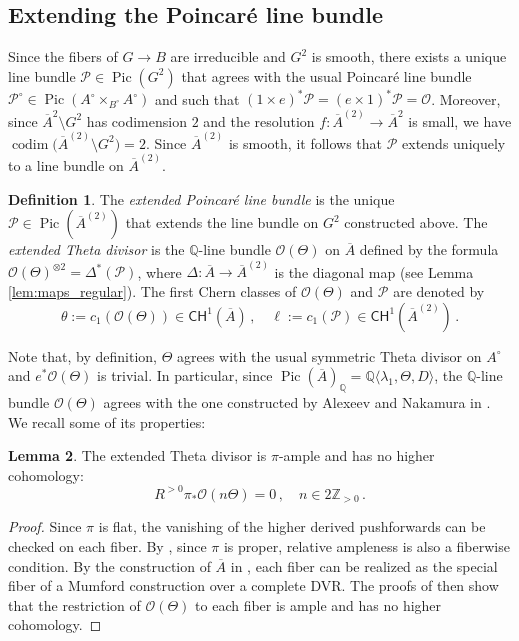 \documentclass[11pt]{article}
\def\CH{\mathsf{CH}}
\def\P{\mathcal{P}}
\def\QQ{\mathbb{Q}}
\newcommand{\barA}{\overline{A}}
\newcommand{\Pic}{\operatorname{Pic}}
\theoremstyle{definition}
\newtheorem{definition}{Definition}[section]
\newtheorem{lemma}[definition]{Lemma}
\begin{document}
\subsection{Extending the Poincar\'e line bundle}\label{subs:extP}

Since the fibers of $G \to B$ are irreducible and $G^2$ is smooth, there exists a unique line bundle $\mathcal P \in \Pic(G^2)$ that agrees with the usual Poincar\'e line bundle $\mathcal P^{\circ} \in \Pic(A^{\circ }\times_{B^\circ}A^{\circ })$ and such that $(1 \times e)^* \mathcal P = (e\times 1)^*\mathcal P = \mathcal O$. Moreover, since $\barA^{2} \setminus G^{2}$ has codimension $2$ and the resolution $f: \barA^{(2)} \to \barA^2$ is small, we have $\operatorname{codim}\big(\barA^{(2)} \setminus G^2\big)=2$. Since $\barA^{(2)}$ is smooth, it follows that $\mathcal{P}$ extends uniquely to a line bundle on $\barA^{(2)}$.

\begin{definition}
	The \emph{extended Poincar\'e line bundle} is the unique $\mathcal P \in \Pic(\barA^{(2)})$ that extends the line bundle on $G^2$ constructed above. The \emph{extended Theta divisor} is the $\mathbb Q$-line bundle $\mathcal O(\Theta)$ on $\barA$ defined by the formula $\mathcal O(\Theta)^{\otimes 2} = \Delta^*(\mathcal P)$, where $\Delta : \barA \to \barA^{(2)}$ is the diagonal map (see Lemma \ref{lem:maps_regular}). The first Chern classes of $\mathcal O(\Theta)$ and $\P$ are denoted by
    $$
    \theta := c_1(\mathcal O(\Theta)) \in \CH^1(\barA)\, , \quad \ell := c_1(\mathcal P) \in \CH^1(\barA^{(2)})\, .
    $$
\end{definition}

Note that, by definition, $\Theta$ agrees with the usual symmetric Theta divisor on $A^\circ$ and $e^* \mathcal O(\Theta)$ is trivial. In particular, since $\Pic(\barA)_{\QQ} = \mathbb Q\langle\lambda_1, \Theta, D\rangle$, the $\mathbb{Q}$-line bundle $\mathcal O(\Theta)$ agrees with the one constructed by Alexeev and Nakamura in \cite{AleNak}. We recall some of its properties:
\begin{lemma}\label{lem:thetample}
    The extended Theta divisor is $\pi$-ample and has no higher cohomology:
    $$
    R^{>0}\pi_* \mathcal O(n\Theta) =0\, ,\quad n \in 2\mathbb Z_{>0}\, .
    $$
\end{lemma}

\begin{proof}
    Since $\pi$ is flat, the vanishing of the higher derived pushforwards can be checked on each fiber. By \cite[Theorem 1.7.8]{Positive1}, since $\pi$ is proper, relative ampleness is also a fiberwise condition.
    By the construction of $\barA$ in \cite{FC}, each fiber can be realized as the special fiber of a Mumford construction \cite{Mumfordanalytic, FC} over a complete DVR. The proofs of \cite[Theorems 4.4 and 4.7]{AleNak} then show that the restriction of $\mathcal O(\Theta)$ to each fiber is ample and has no higher cohomology.
\end{proof}
\end{document}
